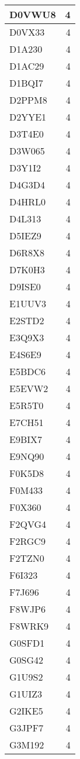 \documentclass[
]{book}
\theoremstyle{definition}
\theoremstyle{definition}
\theoremstyle{definition}
\theoremstyle{definition}
\theoremstyle{remark}
\begin{document}
\begin{table}
\begin{tabular}{l|r}
\hline
D0VWU8 & 4\\
\hline
D0VX33 & 4\\
\hline
D1A230 & 4\\
\hline
D1AC29 & 4\\
\hline
D1BQI7 & 4\\
\hline
D2PPM8 & 4\\
\hline
D2YYE1 & 4\\
\hline
D3T4E0 & 4\\
\hline
D3W065 & 4\\
\hline
D3Y1I2 & 4\\
\hline
D4G3D4 & 4\\
\hline
D4HRL0 & 4\\
\hline
D4L313 & 4\\
\hline
D5IEZ9 & 4\\
\hline
D6R8X8 & 4\\
\hline
D7K0H3 & 4\\
\hline
D9ISE0 & 4\\
\hline
E1UUV3 & 4\\
\hline
E2STD2 & 4\\
\hline
E3Q9X3 & 4\\
\hline
E4S6E9 & 4\\
\hline
E5BDC6 & 4\\
\hline
E5EVW2 & 4\\
\hline
E5R5T0 & 4\\
\hline
E7CH51 & 4\\
\hline
E9BIX7 & 4\\
\hline
E9NQ90 & 4\\
\hline
F0K5D8 & 4\\
\hline
F0M433 & 4\\
\hline
F0X360 & 4\\
\hline
F2QVG4 & 4\\
\hline
F2RGC9 & 4\\
\hline
F2TZN0 & 4\\
\hline
F6I323 & 4\\
\hline
F7J696 & 4\\
\hline
F8WJP6 & 4\\
\hline
F8WRK9 & 4\\
\hline
G0SFD1 & 4\\
\hline
G0SG42 & 4\\
\hline
G1U9S2 & 4\\
\hline
G1UIZ3 & 4\\
\hline
G2IKE5 & 4\\
\hline
G3JPF7 & 4\\
\hline
G3M192 & 4\\

\end{tabular}
\end{table}
\end{document}
